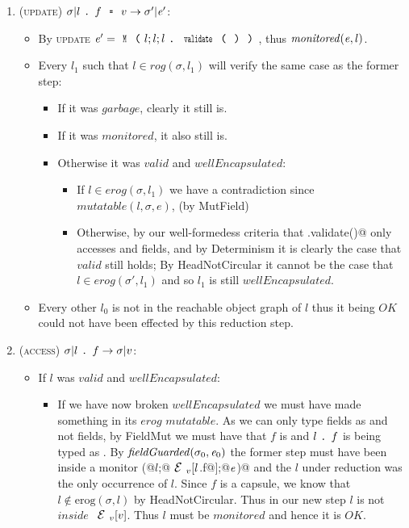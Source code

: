 \begin{enumerate}
\item (\textsc{update}) $\sigma|l\singleDot f\equals v\rightarrow \sigma'|\e'$:
	\begin{itemize}
	  \item By \textsc{update} $\e'=\Kw{M}\oR l;l;l\singleDot\Kw{validate}\oR\cR\cR$, thus $\mathit{monitored}({\mathit{e}},l)$.
	  \item Every $l_1$ such that $l\in \mathit{rog}(\sigma,l_1)$ will verify the same case as the former step:
	  \begin{itemize}
	  	\item If it was $\mathit{garbage}$, clearly it still is.
	  	\item If it was $\mathit{monitored}$, it also still is.
	    \item Otherwise it was $\mathit{valid}$ and $\mathit{wellEncapsulated}$:
			\begin{itemize}
				\item If $l\in \mathit{erog}(\sigma,l_1)$ we have a contradiction since $mutatable(l, \sigma, e)$, (by MutField)
		    	\item Otherwise, by our well-formedess criteria that \Q@.validate()@ only accesses \Q@imm@ and \Q@capsule@ fields, and by Determinism it is clearly the case that $\mathit{valid}$ still holds;
				By HeadNotCircular it cannot be the case that $l\in \mathit{erog}(\sigma',l_1)$ and so $l_1$ is still $\mathit{wellEncapsulated}$.
		  	\end{itemize}
	  \end{itemize}
	  \item Every other $l_0$ is not in the reachable object graph of $l$
	  thus it being $\mathit{OK}$ could not have been effected by this reduction step.
	\end{itemize}

\item (\textsc{access}) $\sigma|l\singleDot f \rightarrow \sigma|v$:
	\begin{itemize}
		\item If $l$ was $valid$ and $wellEncapsulated$:
		\begin{itemize}
			\item If we have now broken $wellEncapsulated$ we must have made something in its $erog$  $mutatable$. As we can only type \Q@capsule@ fields as \Q@mut@ and not \Q@imm@ fields, by FieldMut we must have that $f$ is \Q@capsule@ and $l{ \mbox{ {\texttt{.}} } } f$ is being typed as \Q@mut@. By $\mathit{fieldGuarded}(\sigma_0,\e_0)$ the former step must have been inside a monitor \Q@M(@$l$\Q@;@$\ctx_v[l$\Q@.f@$]$\Q@;@${\mathit{e}}$\Q@)@
		    and the $l$ under reduction was the only occurrence of $l$.
		    Since $f$ is a capsule, we know that $l\notin \text{erog}(\sigma,l)$
		    by HeadNotCircular. Thus in our new step $l$ is not $inside$ $\ctx_v[v]$. Thus $l$ must be $monitored$ and hence it is $OK$.


\end{itemize}
\end{itemize}
\end{enumerate}
